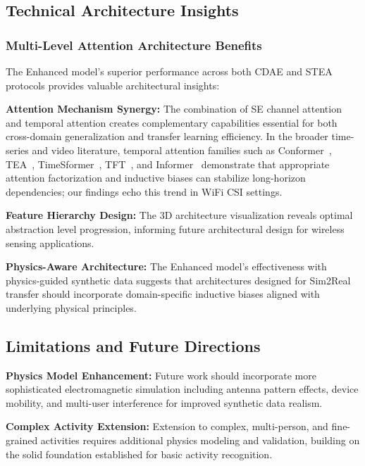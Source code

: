 \documentclass[journal]{IEEEtran}
\begin{document}
\subsection{Technical Architecture Insights}

\subsubsection{Multi-Level Attention Architecture Benefits}

The Enhanced model's superior performance across both CDAE and STEA protocols provides valuable architectural insights:

\textbf{Attention Mechanism Synergy:} The combination of SE channel attention and temporal attention creates complementary capabilities essential for both cross-domain generalization and transfer learning efficiency. In the broader time-series and video literature, temporal attention families such as Conformer~\cite{gulati2020conformer}, TEA~\cite{li2020tea}, TimeSformer~\cite{bertasius2021timesformer}, TFT~\cite{lim2021tft}, and Informer~\cite{zhou2021informer} demonstrate that appropriate attention factorization and inductive biases can stabilize long-horizon dependencies; our findings echo this trend in WiFi CSI settings.

\textbf{Feature Hierarchy Design:} The 3D architecture visualization reveals optimal abstraction level progression, informing future architectural design for wireless sensing applications.

\textbf{Physics-Aware Architecture:} The Enhanced model's effectiveness with physics-guided synthetic data suggests that architectures designed for Sim2Real transfer should incorporate domain-specific inductive biases aligned with underlying physical principles.

\subsection{Limitations and Future Directions}

\textbf{Physics Model Enhancement:} Future work should incorporate more sophisticated electromagnetic simulation including antenna pattern effects, device mobility, and multi-user interference for improved synthetic data realism.

\textbf{Complex Activity Extension:} Extension to complex, multi-person, and fine-grained activities requires additional physics modeling and validation, building on the solid foundation established for basic activity recognition.
\end{document}

